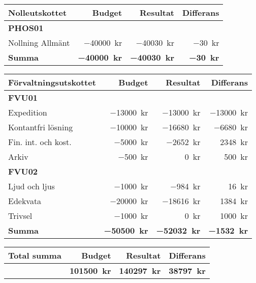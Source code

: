 \documentclass[../_main/handlingar.tex]{subfiles}
\begin{document}
\begin{tabularx}{12cm}{X r r r}
    \textbf{\large Nolleutskottet} & \textbf{Budget} & \textbf{Resultat} & \textbf{Differans} \\
    \hline
    \textbf{PHOS01} \\
    Nollning Allmänt & \SI{-40000}{kr} & \SI{-40030}{kr} & \SI{-30}{kr}\\
    \hline
    \textbf{Summa} & \textbf{\SI{-40000}{kr}} & \textbf{\SI{-40030}{kr}} & \textbf{\SI{-30}{kr}}\\
\end{tabularx}

\begin{tabularx}{12cm}{X r r r}
    \textbf{\large Förvaltningsutskottet} & \textbf{Budget} & \textbf{Resultat} & \textbf{Differans} \\
    \hline
    \textbf{FVU01} \\
    Expedition & \SI{-13000}{kr} & \SI{-13000}{kr} & \SI{-13000}{kr} \\
    Kontantfri lösning & \SI{-10000}{kr} & \SI{-16680}{kr} & \SI{-6680}{kr} \\
    Fin. int. och kost. & \SI{-5000}{kr} & \SI{-2652}{kr} & \SI{2348}{kr}  \\
    Arkiv & \SI{-500}{kr} & \SI{0}{kr} & \SI{500}{kr} \\
    \textbf{FVU02} \\
    Ljud och ljus & \SI{-1000}{kr} & \SI{-984}{kr} & \SI{16}{kr}\\
    Edekvata & \SI{-20000}{kr} & \SI{-18616}{kr} & \SI{1384}{kr}\\
    Trivsel & \SI{-1000}{kr} & \SI{0}{kr} & \SI{1000}{kr}\\
    \hline
    \textbf{Summa} & \textbf{\SI{-50500}{kr}} & \textbf{\SI{-52032}{kr}} & \textbf{\SI{-1532}{kr}}\\
\end{tabularx}

\begin{tabularx}{12cm}{X r r r}
    \textbf{\large Total summa} & \textbf{Budget} & \textbf{Resultat} & \textbf{Differans}\\
    \hline
     & \textbf{\SI{101500}{kr}} & \textbf{\SI{140297}{kr}} & \textbf{\SI{38797}{kr}} \\
\end{tabularx}


\newpage
\end{document}
